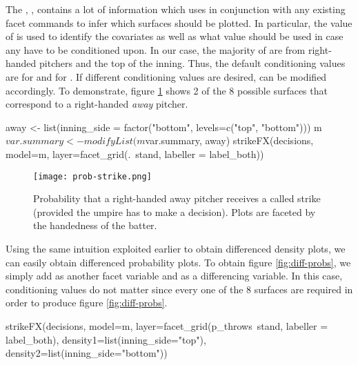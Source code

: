 \begin{article}
The , , contains a lot of information which
 uses in conjunction with any existing facet commands
to infer which surfaces should be plotted. In particular, the 
value of  is used to identify the covariates as well as what
value should be used in case any have to be conditioned upon. In our
case, the majority of  are from right-handed pitchers
and the top of the inning. Thus, the default conditioning values are
 for  and  for .
If different conditioning values are desired, 
can be modified accordingly. To demonstrate, figure \ref{fig:strike-probs}
shows 2 of the 8 possible surfaces that correspond to a right-handed
\emph{away} pitcher.

\begin{Schunk}
\begin{Sinput}
away <- list(inning_side = factor("bottom", levels=c("top", "bottom")))
m$var.summary <- modifyList(m$var.summary, away)
strikeFX(decisions, model=m, layer=facet_grid(.~stand, labeller = label_both))
\end{Sinput}
\end{Schunk}


\begin{figure}[h]
\centerline{\texttt{[image: prob-strike.png]}}

\caption{\label{fig:strike-probs}Probability that a right-handed away pitcher
receives a called strike (provided the umpire has to make a decision).
Plots are faceted by the handedness of the batter.}
\end{figure}


Using the same intuition exploited earlier to obtain differenced density
plots, we can easily obtain differenced probability plots. To obtain
figure \ref{fig:diff-probs}, we simply add  as another
facet variable and  as a differencing variable.
In this case, conditioning values do not matter since every one of
the 8 surfaces are required in order to produce figure \ref{fig:diff-probs}.

\begin{Schunk}
\begin{Sinput}
strikeFX(decisions, model=m, layer=facet_grid(p_throws~stand, labeller = label_both),
		density1=list(inning_side="top"), density2=list(inning_side="bottom"))
\end{Sinput}
\end{Schunk}



\end{article}
